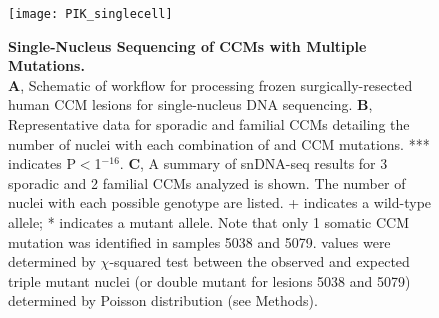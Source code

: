 \begin{figure}[tbp!]
\begin{center}
\texttt{[image: PIK\_singlecell]}
\end{center}
\caption[Single-Nucleus Sequencing of CCMs with Three Pathogenic Mutations.] {\textbf{Single-Nucleus Sequencing of CCMs with Multiple Mutations.} \\ \textbf{A}, Schematic of workflow for processing frozen surgically-resected human CCM lesions for single-nucleus DNA sequencing. \textbf{B}, Representative data for sporadic and familial CCMs detailing the number of nuclei with each combination of  and CCM mutations. *** indicates P$<$1$^{-16}$. \textbf{C}, A summary of snDNA-seq results for 3 sporadic and 2 familial CCMs analyzed is shown. The number of nuclei with each possible genotype are listed. + indicates a wild-type allele; * indicates a mutant allele. Note that only 1 somatic CCM mutation was identified in samples 5038 and 5079.  values were determined by $\chi$-squared test between the observed and expected triple mutant nuclei (or double mutant for lesions 5038 and 5079) determined by Poisson distribution (see Methods).}

\label{PIK_singlecell}
\end{figure}
